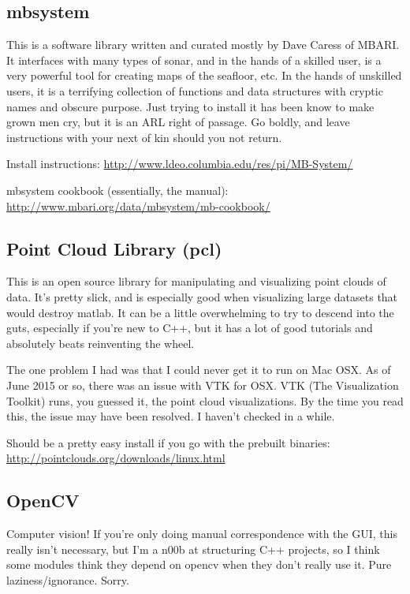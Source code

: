 \documentclass[12pt]{amsart}
\begin{document}
\subsection{mbsystem}
This is a software library written and curated mostly by Dave Caress of MBARI. It interfaces with many types of sonar, and in the hands of a skilled user, is a very powerful tool for creating maps of the seafloor, etc. In the hands of unskilled users, it is a terrifying collection of functions and data structures with cryptic names and obscure purpose. Just trying to install it has been know to make grown men cry, but it is an ARL right of passage. Go boldly, and leave instructions with your next of kin should you not return.

Install instructions: \url{http://www.ldeo.columbia.edu/res/pi/MB-System/}

mbsystem cookbook (essentially, the manual): \url{http://www.mbari.org/data/mbsystem/mb-cookbook/}

\subsection{Point Cloud Library (pcl)}
This is an open source library for manipulating and visualizing point clouds of data. It's pretty slick, and is especially good when visualizing large datasets that would destroy matlab. It can be a little overwhelming to try to descend into the guts, especially if you're new to C++, but it has a lot of good tutorials and absolutely beats reinventing the wheel.

The one problem I had was that I could never get it to run on Mac OSX. As of June 2015 or so, there was an issue with VTK for OSX. VTK (The Visualization Toolkit) runs, you guessed it, the point cloud visualizations. By the time you read this, the issue may have been resolved. I haven't checked in a while.

Should be a pretty easy install if you go with the prebuilt binaries: 
\url{http://pointclouds.org/downloads/linux.html}

\subsection{OpenCV}
Computer vision! If you're only doing manual correspondence with the GUI, this really isn't necessary, but I'm a n00b at structuring C++ projects, so I think some modules think they depend on opencv when they don't really use it. Pure laziness/ignorance. Sorry.
\end{document}
